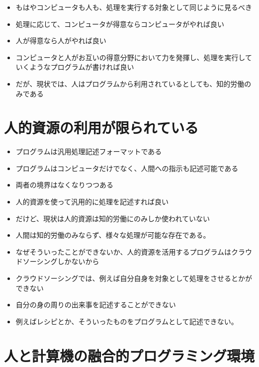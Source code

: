\begin{itemize}
\itemsep1pt\parskip0pt
\item
  もはやコンピュータも人も、処理を実行する対象として同じように見るべき
\item
  処理に応じて、コンピュータが得意ならコンピュータがやれば良い
\item
  人が得意なら人がやれば良い
\item
  コンピュータと人がお互いの得意分野において力を発揮し、処理を実行していくようなプログラムが書ければ良い
\item
  だが、現状では、人はプログラムから利用されているとしても、知的労働のみである
\end{itemize}

\section{人的資源の利用が限られている}\label{ux4ebaux7684ux8cc7ux6e90ux306eux5229ux7528ux304cux9650ux3089ux308cux3066ux3044ux308b}

\begin{itemize}
\itemsep1pt\parskip0pt
\item
  プログラムは汎用処理記述フォーマットである
\item
  プログラムはコンピュータだけでなく、人間への指示も記述可能である
\item
  両者の境界はなくなりつつある
\item
  人的資源を使って汎用的に処理を記述すれば良い
\item
  だけど、現状は人的資源は知的労働にのみしか使われていない
\item
  人間は知的労働のみならず、様々な処理が可能な存在である。
\item
  なぜそういったことができないか、人的資源を活用するプログラムはクラウドソーシングしかないから
\item
  クラウドソーシングでは、例えば自分自身を対象として処理をさせるとかができない
\item
  自分の身の周りの出来事を記述することができない
\item
  例えばレシピとか、そういったものをプログラムとして記述できない。
\end{itemize}

\section{人と計算機の融合的プログラミング環境}\label{ux4ebaux3068ux8a08ux7b97ux6a5fux306eux878dux5408ux7684ux30d7ux30edux30b0ux30e9ux30dfux30f3ux30b0ux74b0ux5883}


